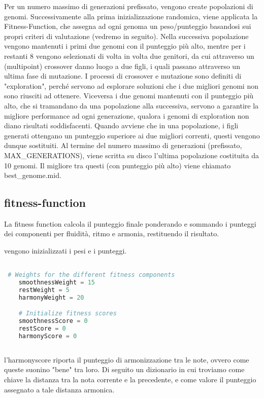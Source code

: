 \documentclass[a4paper,12pt]{report}
\begin{document}
Per un numero massimo di generazioni prefissato, vengono create popolazioni di genomi.
Successivamente alla prima inizializzazione randomica, viene applicata la Fitness-Function, che assegna ad ogni genoma un peso/punteggio basandosi sui propri criteri di valutazione (vedremo in seguito).
Nella successiva popolazione vengono mantenuti i primi due genomi con il punteggio più alto, mentre per i restanti 8 vengono selezionati di volta in volta due genitori, da cui attraverso un (multipoint) crossover danno luogo a due figli, i quali passano attraverso un ultima fase di mutazione.
I processi di crossover e mutazione sono definiti di "exploration", perché servono ad esplorare soluzioni che i due migliori genomi non sono riusciti ad ottenere.
Viceversa i due genomi mantenuti con il punteggio più alto, che si tramandano da una popolazione alla successiva, servono a garantire la migliore performance ad ogni generazione, qualora i genomi di exploration non diano risultati soddisfacenti.
Quando avviene che in una popolazione, i figli generati ottengano un punteggio superiore ai due migliori correnti, questi vengono dunque sostituiti.
Al termine del numero massimo di generazioni (prefissato, MAX_GENERATIONS), viene scritta su disco l'ultima popolazione costituita da 10 genomi.
Il migliore tra questi (con punteggio più alto) viene chiamato best_genome.mid.

\subsection*{fitness-function}

La fitness function calcola il punteggio finale ponderando e sommando i punteggi dei componenti per fluidità, ritmo e armonia, restituendo il risultato.

vengono inizializzati i pesi e i punteggi.

\begin{lstlisting}[language=Python]

 # Weights for the different fitness components
    smoothnessWeight = 15
    restWeight = 5
    harmonyWeight = 20

    # Initialize fitness scores
    smoothnessScore = 0
    restScore = 0
    harmonyScore = 0
    
\end{lstlisting}

l'harmonyscore riporta il punteggio di armonizzazione tra le note, ovvero come queste suonino "bene" tra loro.
Di seguito un dizionario in cui troviamo come chiave la distanza tra la nota corrente e la precedente, e come valore il punteggio assegnato a tale distanza armonica.
\end{document}
